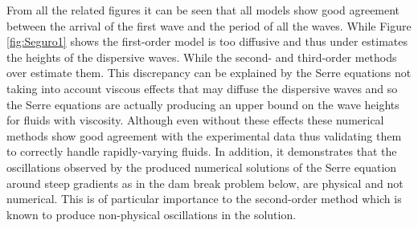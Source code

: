 \documentclass[SingleSpace,12pt]{Serre_ASCE}
\begin{document}
From all the related figures it can be seen that all models show good agreement between the arrival of the first wave and the period of all the waves. While Figure \ref{fig:Seguro1} shows the first-order model is too diffusive and thus under estimates the heights of the dispersive waves. While the second- and third-order methods over estimate them. This discrepancy can be explained by the Serre equations not taking into account viscous effects that may diffuse the dispersive waves and so the Serre equations are actually producing an upper bound on the wave heights for fluids with viscosity. Although even without these effects these numerical methods show good agreement with the experimental data thus validating them to correctly handle rapidly-varying fluids. In addition, it demonstrates that the oscillations observed by the produced numerical solutions of the Serre equation around steep gradients as in the dam break problem below, are physical and not numerical. This is of particular importance to the second-order method which is known \cite{Zoppou-Roberts-1996} to produce non-physical oscillations in the solution.  
\end{document}
